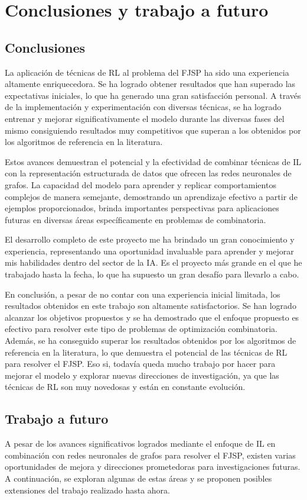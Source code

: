 \section{Conclusiones y trabajo a futuro}
\subsection{Conclusiones}
La aplicación de técnicas de RL al problema del FJSP ha sido una experiencia 
altamente enriquecedora. Se ha logrado obtener resultados que han superado las 
expectativas iniciales, lo que ha generado una gran satisfacción personal.
A través de la implementación y experimentación con diversas técnicas, se ha 
logrado entrenar y mejorar significativamente el modelo durante las diversas 
fases del mismo consiguiendo resultados muy competitivos que superan a los
obtenidos por los algoritmos de referencia en la literatura.\medskip

Estos avances demuestran el potencial y la efectividad de  combinar técnicas de 
IL con la representación estructurada de datos que ofrecen las redes 
neuronales de grafos. La capacidad del modelo para aprender y replicar comportamientos 
complejos de manera semejante, demostrando un aprendizaje efectivo a partir de ejemplos 
proporcionados, brinda importantes perspectivas para aplicaciones futuras en diversas 
áreas específicamente en problemas de combinatoria.\medskip

El desarrollo completo de este proyecto me ha brindado un gran conocimiento 
y experiencia, representando una oportunidad invaluable para aprender y mejorar 
mis habilidades dentro del sector de la IA. Es el proyecto más grande en el que 
he trabajado hasta la fecha, lo que ha supuesto un gran desafío para llevarlo 
a cabo.\medskip

En conclusión, a pesar de no contar con una experiencia inicial limitada, los resultados 
obtenidos en este trabajo son altamente satisfactorios. Se han logrado alcanzar
los objetivos propuestos y se ha demostrado que el enfoque propuesto es efectivo
para resolver este tipo de problemas de optimización combinatoria. Además, se ha
conseguido superar los resultados obtenidos por los algoritmos de referencia en la
literatura, lo que demuestra el potencial de las técnicas de RL para resolver el FJSP.
Eso si, todavía queda mucho trabajo por hacer para mejorar el modelo y explorar
nuevas direcciones de investigación, ya que las técnicas de RL son muy novedosas y
están en constante evolución.


\subsection{Trabajo a futuro}
A pesar de los avances significativos logrados mediante el enfoque de 
IL en combinación con redes neuronales de grafos para resolver el FJSP, 
existen varias oportunidades de mejora y direcciones prometedoras para 
investigaciones futuras. A continuación, se exploran algunas de estas 
áreas y se proponen posibles extensiones del trabajo realizado hasta ahora.

